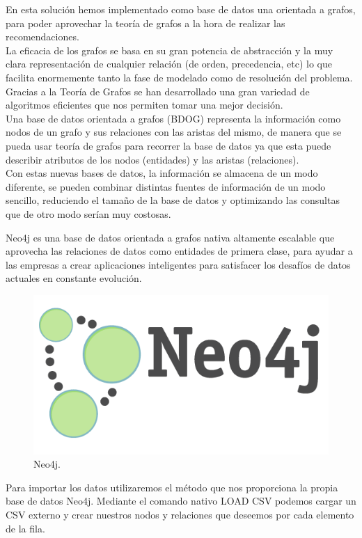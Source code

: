 \documentclass[12pt,a4paper]{article}
\begin{document}
		En esta solución hemos implementado como base de datos una orientada a grafos, para poder aprovechar la teoría de grafos a la hora de realizar las recomendaciones.\\
		
		La eficacia de los grafos se basa en su gran potencia de abstracción y la muy clara representación de cualquier relación (de orden, precedencia, etc) lo que facilita enormemente tanto la fase de modelado como de resolución del problema. Gracias a la Teoría de Grafos se han desarrollado una gran variedad de algoritmos eficientes que nos permiten tomar una mejor decisión.\\	
		
		Una base de datos orientada a grafos (BDOG) representa la información como nodos de un grafo y sus relaciones con las aristas del mismo, de manera que se pueda usar teoría de grafos para recorrer la base de datos ya que esta puede describir atributos de los nodos (entidades) y las aristas (relaciones).\\
		
		Con estas nuevas bases de datos, la información se almacena de un modo diferente, se pueden combinar distintas fuentes de información de un modo sencillo, reduciendo el tamaño de la base de datos y optimizando las consultas que de otro modo serían muy costosas.
		
		Neo4j es una base de datos orientada a grafos nativa altamente escalable que aprovecha las relaciones de datos como entidades de primera clase, para ayudar a las empresas a crear aplicaciones inteligentes para satisfacer los desafíos de datos actuales en constante evolución.\\
		
		\begin{figure}[tbph!]
			\centering
			\includegraphics[width=0.5\linewidth]{images/neo4j_notag_whitebg}
			\caption{Neo4j.}
			\label{fig:Neo4j}
		\end{figure}
		\clearpage
		
		Para importar los datos utilizaremos el método que nos proporciona la propia base de datos Neo4j. Mediante el comando nativo LOAD CSV podemos cargar un CSV externo y crear nuestros nodos y relaciones que deseemos por cada elemento de la fila.\\
		
\end{document}
